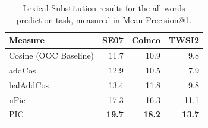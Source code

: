 \documentclass[12pt]{article}
\begin{document}
\begin{table}
\begin{center}
\begin{tabular}{|l|r|r|r|}
  \hline
  {\bf Measure} & {\bf SE07} & {\bf Coinco} & {\bf TWSI2}\\
  \hline\hline
  Cosine (OOC Baseline)                    &     11.7   &    10.9   &      9.8       \\
  addCos                                   &     12.9   &    10.5   &      7.9       \\
  balAddCos                                &     13.4   &    11.8   &      9.8       \\
  \hline
  nPic                                     &     17.3   &    16.3   &     11.1       \\
  PIC                                      & {\bf19.7}  &{\bf18.2}  & {\bf13.7}      \\
  \hline
\end{tabular}
\end{center}
\caption{Lexical Substitution results for the all-words prediction task, measured
in Mean Precision@1.}
\label{tab:lexsub}
\end{table}
\end{document}
